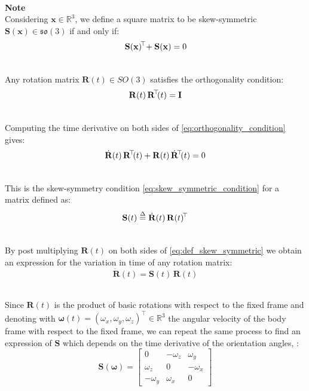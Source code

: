 \documentclass[main]{subfiles}
\begin{document}
    
\noindent\\
\textbf{Note}\noindent\\
Considering \( \mathbf{x} \in \mathbb{R}^3 \), we define a square matrix to 
be skew-symmetric \( \mathbf{S}(\mathbf{x}) \in \mathfrak{so}(3) \)
if and only if:
\begin{equation}
\mathbf{S}(\mathbf{x})\mkern-3mu^\top \mkern-4mu + \mathbf{S}(\mathbf{x}) = 0
\label{eq:skew_symmetric_condition}
\end{equation}

\noindent\\
Any rotation matrix \( \mathbf{R}(t) \in SO(3)\) satisfies the orthogonality condition:
\begin{equation}
\mathbf{R}(t) \, \mathbf{R}\mkern-3mu^\top\mkern-4mu(t) = \mathbf{I}
\label{eq:orthogonality_condition}
\end{equation}

\noindent\\
Computing the time derivative on both sides of \ref{eq:orthogonality_condition} gives:
\begin{equation}
\dot{\mathbf{R}}(t) \, \mathbf{R}\mkern-3mu^\top\mkern-4mu(t) + \mathbf{R}(t) \, \dot{\mathbf{R}}\mkern-3mu^\top\mkern-4mu(t) = 0
\label{eq:time_derivative_orthogonality}
\end{equation}

\noindent\\
This is the skew-symmetry condition \eqref{eq:skew_symmetric_condition} 
for a matrix defined as:
\begin{equation}
\mathbf{S}(t) \stackrel{\Delta}{=} \dot{\mathbf{R}}(t) \, \mathbf{R}(t)\mkern-3mu^\top
\label{eq:def_skew_symmetric}
\end{equation}

\noindent\\
By post multiplying $\mathbf{R}(t)$ on both sides of \ref{eq:def_skew_symmetric} we
obtain an expression for the variation in time of any rotation matrix:
\begin{equation}
\dot{\mathbf{R}}(t) = \mathbf{S}(t) \, \mathbf{R}(t)
\label{eq:skew_symmetric_rotation}
\end{equation}

\noindent\\
Since $\mathbf{R}(t)$ is the product of basic rotations with respect to the fixed frame and  
denoting with $ \boldsymbol{\omega}(t) = (\omega_x, \omega_y,  \omega_z)^\top \in \mathbb{R}^3$ the angular velocity of the body frame with respect to the fixed frame, 
we can repeat the same process to find an expression of $\mathbf{S}$ which depends on the time
derivative of the orientation angles, \cite{book-robotics}:
\begin{equation}
\mathbf{S}(\boldsymbol{\omega}) = 
\begin{bmatrix}
    0 & -\omega_z & \omega_y \\
    \omega_z & 0 & -\omega_x \\
 -\omega_y & \omega_x & 0
\end{bmatrix}
\label{eq:skew_symmetric_matrix}
\end{equation}
\end{document}

